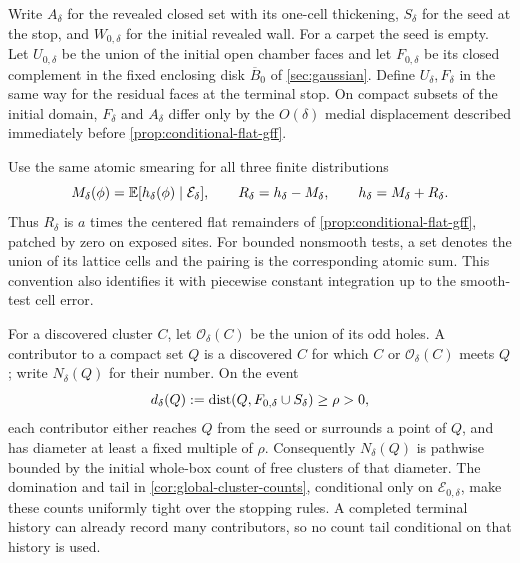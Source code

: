 Write \(A_\delta\) for the revealed closed set with its one-cell
thickening, \(S_\delta\) for the seed at the stop, and \(W_{0,\delta}\)
for the initial revealed wall. For a carpet the seed is empty. Let
\(U_{0,\delta}\) be the union of the initial open chamber faces and let
\(F_{0,\delta}\) be its closed complement in the fixed enclosing disk
\(\overline B_0\) of \cref{sec:gaussian}. Define \(U_\delta,F_\delta\)
in the same way for the residual faces at the terminal stop. On compact
subsets of the initial domain, \(F_\delta\) and \(A_\delta\) differ only
by the \(O(\delta)\) medial displacement described immediately before
\cref{prop:conditional-flat-gff}.

Use the same atomic smearing for all three finite distributions
\[
 M_\delta(\phi)=\mathbb E[h_\delta(\phi)\mid\mathcal E_\delta],
 \qquad R_\delta=h_\delta-M_\delta,\qquad h_\delta=M_\delta+R_\delta.
\]
Thus \(R_\delta\) is \(a\) times the centered flat remainders of
\cref{prop:conditional-flat-gff}, patched by zero on exposed sites.
For bounded nonsmooth tests, a set denotes the union of its lattice
cells and the pairing is the corresponding atomic sum. This convention
also identifies it with piecewise constant integration up to the
smooth-test cell error.

For a discovered cluster \(C\), let \(\mathcal O_\delta(C)\) be the union
of its odd holes. A contributor to a compact set \(Q\) is a discovered
\(C\) for which \(C\) or \(\mathcal O_\delta(C)\) meets \(Q\); write
\(N_\delta(Q)\) for their number. On the event
\[
 d_\delta(Q):=\operatorname{dist}(Q,F_{0,\delta}\cup S_\delta)\ge\rho>0,
\]
each contributor either reaches \(Q\) from the seed or surrounds a point
of \(Q\), and has diameter at least a fixed multiple of \(\rho\).
Consequently \(N_\delta(Q)\) is pathwise bounded by the initial
whole-box count of free clusters of that diameter. The domination and
tail in \cref{cor:global-cluster-counts}, conditional only on
\(\mathcal E_{0,\delta}\), make these counts uniformly tight over the
stopping rules. A completed terminal history can already record many
contributors, so no count tail conditional on that history is used.

